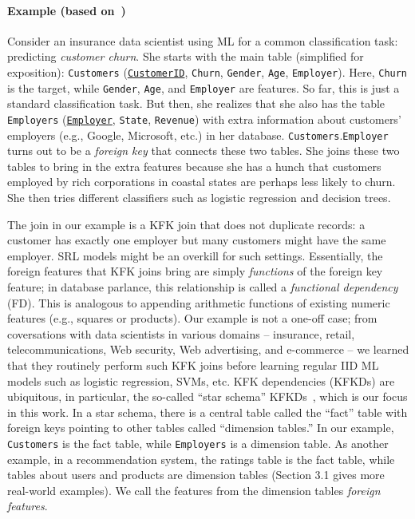 \documentclass[sigconf]{acmart}
\begin{document}
\paragraph*{Example (based on~\cite{orion})}
Consider an insurance data scientist using ML for a common classification task: predicting \textit{customer churn}. She starts with the main table (simplified 
for exposition): \texttt{Customers} (\underline{\texttt{CustomerID}}, \texttt{Churn}, \texttt{Gender}, \texttt{Age}, \texttt{Employer}). 
Here, \texttt{Churn} is the target, while \texttt{Gender}, \texttt{Age}, and \texttt{Employer} are features. So far, this is just a standard classification task.  
But then, she realizes that she also has the table \texttt{Employers} (\underline{\texttt{Employer}}, \texttt{State}, \texttt{Revenue}) with extra information about customers' employers 
(e.g., Google, Microsoft, etc.) in her database. \texttt{Customers}.\texttt{Employer} turns out to be a \textit{foreign key} that connects these two tables. 
She joins these two tables to bring in the extra features because she has a hunch that customers employed by rich corporations in coastal states are perhaps 
less likely to churn. She then tries different classifiers such as logistic regression and decision trees.

The join in our example is a KFK join that does not duplicate records: a customer has exactly one employer but many customers might have the same employer.
SRL models might be an overkill for such settings. Essentially, the foreign features that KFK joins bring are simply \textit{functions} of the foreign key feature;
in database parlance, this relationship is called a \textit{functional dependency} (FD). This is analogous to appending arithmetic functions of existing numeric 
features (e.g., squares or products). Our example is not a one-off case; 
from coversations with data scientists in various domains -- insurance, retail, telecommunications, Web security, Web advertising, and e-commerce -- 
we learned that they routinely perform such KFK joins before learning regular IID ML models such as logistic regression, SVMs, etc. KFK dependencies (KFKDs) are ubiquitous, 
in particular, the so-called ``star schema'' KFKDs~\cite{cowbook}, which is our focus in this work. In a star schema, 
there is a central table called the ``fact'' table with foreign keys pointing to other tables called ``dimension tables.'' In our example, \texttt{Customers} is the fact table, 
while \texttt{Employers} is a dimension table. As another example, in a recommendation system, the ratings table is the fact table, while tables about users and products are 
dimension tables (Section 3.1 gives more real-world examples). We call the features from the dimension tables \textit{foreign features}.
\end{document}
